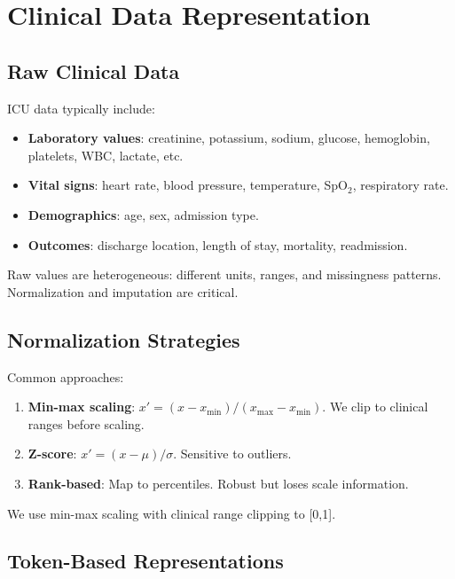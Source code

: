 \section{Clinical Data Representation}

\subsection{Raw Clinical Data}

ICU data typically include:
\begin{itemize}
\item \textbf{Laboratory values}: creatinine, potassium, sodium, glucose, hemoglobin, platelets, WBC, lactate, etc.
\item \textbf{Vital signs}: heart rate, blood pressure, temperature, SpO$_2$, respiratory rate.
\item \textbf{Demographics}: age, sex, admission type.
\item \textbf{Outcomes}: discharge location, length of stay, mortality, readmission.
\end{itemize}

Raw values are heterogeneous: different units, ranges, and missingness patterns. Normalization and imputation are critical.

\subsection{Normalization Strategies}

Common approaches:
\begin{enumerate}
\item \textbf{Min-max scaling}: $x' = (x - x_{\min}) / (x_{\max} - x_{\min})$. We clip to clinical ranges before scaling.
\item \textbf{Z-score}: $x' = (x - \mu) / \sigma$. Sensitive to outliers.
\item \textbf{Rank-based}: Map to percentiles. Robust but loses scale information.
\end{enumerate}
We use min-max scaling with clinical range clipping to [0,1].

\subsection{Token-Based Representations}

